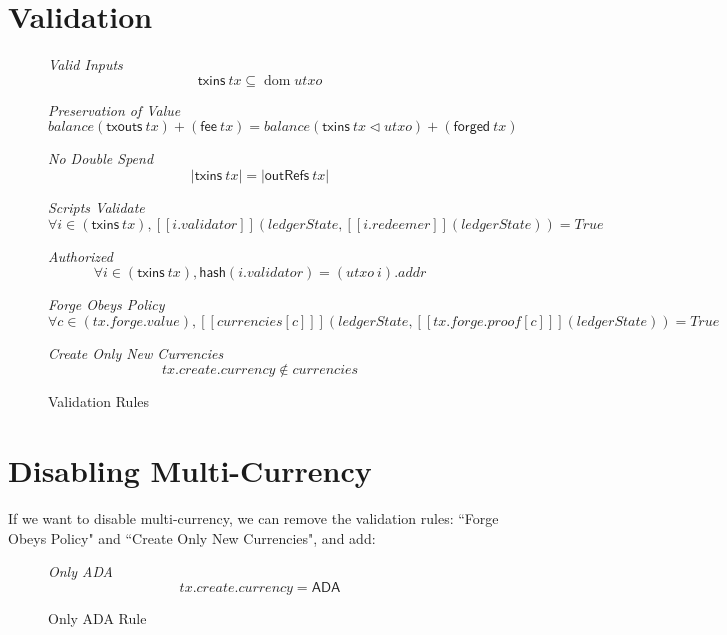\documentclass[11pt,a4paper]{article}
\DeclareMathOperator{\dom}{dom}
\newcommand{\restrictdom}{\lhd}
\newcommand{\var}[1]{\mathit{#1}}
\newcommand{\fun}[1]{\mathsf{#1}}
\newcommand{\ScrEval}[1]{[\![ #1 ]\!]}
\newcommand{\txins}[1]{\fun{txins}\ \var{#1}}
\newcommand{\txouts}[1]{\fun{txouts}\ \var{#1}}
\begin{document}
\section{Validation}

\begin{figure}
\emph{Valid Inputs}
%
\begin{equation*}
\txins{tx} \subseteq \dom \var{utxo}
\end{equation*}

\emph{Preservation of Value}
%
\begin{equation*}
balance (\txouts tx) + (\fun{fee}\ tx)
  = balance (\txins tx \restrictdom utxo) + (\fun{forged} ~ tx)
\end{equation*}

\emph{No Double Spend}
%
\begin{equation*}
\lvert \txins tx \rvert = \lvert \fun{outRefs} ~ tx\rvert
\end{equation*}

\emph{Scripts Validate}
%
\begin{equation*}
\forall i\in(\txins tx),
  \ScrEval{i.validator}
    \left(ledgerState, \ScrEval{i.redeemer}\left(ledgerState\right)\right) = True
\end{equation*}

\emph{Authorized}
%
\begin{equation*}
\forall i\in(\txins tx),
  \fun{hash}(i.validator) = (utxo ~ i).addr
\end{equation*}

\emph{Forge Obeys Policy}
%
\begin{equation*}
\forall c\in(tx.forge.value),
  \ScrEval{currencies[c]}
    \left(ledgerState, \ScrEval{tx.forge.proof[c]}\left(ledgerState\right)\right) = True
\end{equation*}

\emph{Create Only New Currencies}
%
\begin{equation*}
tx.create.currency \notin currencies
\end{equation*}

\caption{Validation Rules}
\label{fig:validation_rules}
\end{figure}

\section{Disabling Multi-Currency}

If we want to disable multi-currency, we can remove the validation rules: ``Forge Obeys Policy" and ``Create Only New Currencies",
and add:
\begin{figure}
\emph{Only ADA}
%
\begin{equation*}
tx.create.currency = \mathsf{ADA}
\end{equation*}

\caption{Only ADA Rule}
\label{fig:validation_rules}
\end{figure}
\end{document}
